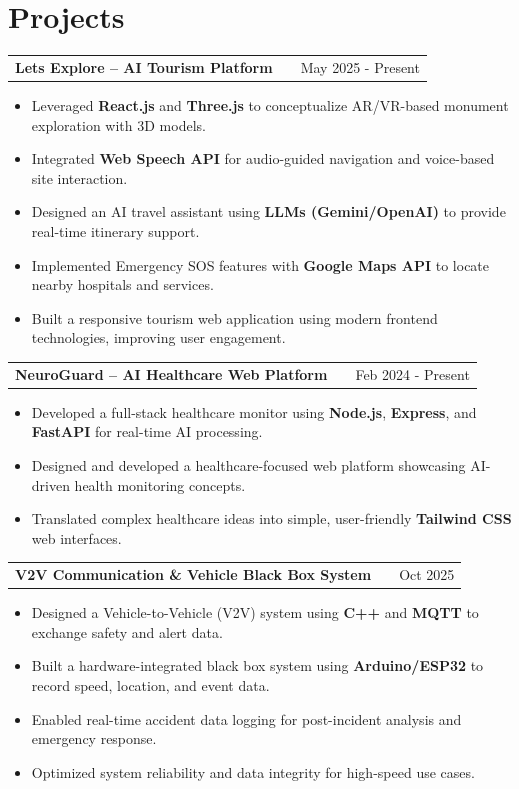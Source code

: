 \documentclass[a4paper,12pt]{article}
\makeatletter
\newenvironment{joblong}[2]
    {
    \begin{tabularx}{\linewidth}{@{}l X r@{}}
    \textbf{#1} & \hfill &  #2 \\[3.75pt]
    \end{tabularx}
    \begin{minipage}[t]{\linewidth}
    \begin{itemize}[nosep,after=\strut, leftmargin=1em, itemsep=3pt,label=--]
    }
    {
    \end{itemize}
    \end{minipage}    
    }
\makeatother
\begin{document}
\section{Projects}

\begin{joblong}{Lets Explore -- AI Tourism Platform}{May 2025 - Present}
\item Leveraged \textbf{React.js} and \textbf{Three.js} to conceptualize AR/VR-based monument exploration with 3D models.
\item Integrated \textbf{Web Speech API} for audio-guided navigation and voice-based site interaction.
\item Designed an AI travel assistant using \textbf{LLMs (Gemini/OpenAI)} to provide real-time itinerary support.
\item Implemented Emergency SOS features with \textbf{Google Maps API} to locate nearby hospitals and services.
\item Built a responsive tourism web application using modern frontend technologies, improving user engagement.
\end{joblong}

\begin{joblong}{NeuroGuard -- AI Healthcare Web Platform}{Feb 2024 - Present}
\item Developed a full-stack healthcare monitor using \textbf{Node.js}, \textbf{Express}, and \textbf{FastAPI} for real-time AI processing.
\item Designed and developed a healthcare-focused web platform showcasing AI-driven health monitoring concepts.
\item Translated complex healthcare ideas into simple, user-friendly \textbf{Tailwind CSS} web interfaces.
\end{joblong}

\newpage
\begin{joblong}{V2V Communication \& Vehicle Black Box System}{Oct 2025}
\item Designed a Vehicle-to-Vehicle (V2V) system using \textbf{C++} and \textbf{MQTT} to exchange safety and alert data.
\item Built a hardware-integrated black box system using \textbf{Arduino/ESP32} to record speed, location, and event data.
\item Enabled real-time accident data logging for post-incident analysis and emergency response.
\item Optimized system reliability and data integrity for high-speed use cases.
\end{joblong}
\end{document}
